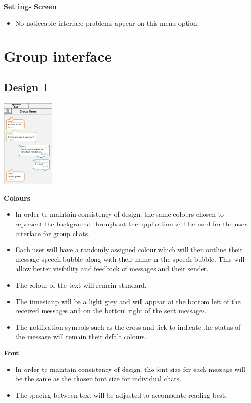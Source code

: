 \documentclass[11pt]{article}
\begin{document}
\textbf{Settings Screen}
\begin{itemize}
\item No noticeable interface problems appear on this menu option.
\end{itemize}

\newpage
\section{Group interface}
\subsection{Design 1}
\centerline{\includegraphics[width=100px]{D01.jpg}}

\textbf{Colours}\\
\begin{itemize}
\item	In order to maintain consistency of design, the same colours chosen to represent the background throughout the application will be used for the user interface for group chats.
\item	Each user will have a randomly assigned colour which will then outline their message speech bubble along with their name in the speech bubble. This will allow better visibility and feedback of messages and their sender.
\item	The colour of the text will remain standard.
\item The timestanp will be a light grey and will appear at the bottom left of the received  messages and on the bottom right of the sent messages.
\item The notification symbols such as the cross and tick to indicate the status of the message will remain their defalt colours.\\
\end{itemize}

\textbf{Font}\\
\begin{itemize}
\item	In order to maintain consistency of design, the font size for each message will be the same as the chosen font size for individual chats.
\item The spacing between text will be adjusted to accomadate reading best.
\end{itemize}
\end{document}
